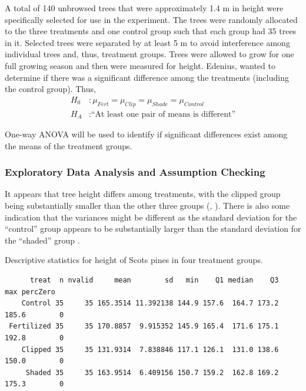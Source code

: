 \documentclass[10pt,openany]{book}\usepackage[]{graphicx}\usepackage[]{color}
\makeatletter
\newenvironment{kframe}{%
 \def\at@end@of@kframe{}%
 \ifinner\ifhmode%
  \def\at@end@of@kframe{\end{minipage}}%
  \begin{minipage}{\columnwidth}%
 \fi\fi%
 \def\FrameCommand##1{\hskip\@totalleftmargin \hskip-\fboxsep
 \colorbox{shadecolor}{##1}\hskip-\fboxsep
     \hskip-\linewidth \hskip-\@totalleftmargin \hskip\columnwidth}%
 \MakeFramed {\advance\hsize-\width
   \@totalleftmargin\z@ \linewidth\hsize
   \@setminipage}}%
 {\par\unskip\endMakeFramed%
 \at@end@of@kframe}
\newenvironment{knitrout}{}{} %
\makeatother
\begin{document}
A total of 140 unbrowsed trees that were approximately 1.4 m in height were specifically selected for use in the experiment.  The trees were randomly allocated to the three treatments and one control group such that each group had 35 trees in it.  Selected trees were separated by at least 5 m to avoid interference among individual trees and, thus, treatment groups.  Trees were allowed to grow for one full growing season and then were measured for height.  Edenius, wanted to determine if there was a significant difference among the treatments (including the control group).  Thus,
\[ \begin{split}
   H_{0}&: \mu_{Fert} = \mu_{Clip} = \mu_{Shade} = \mu_{Control} \\
   H_{A}&:\text{``At least one pair of means is different''}
\end{split} \]

One-way ANOVA will be used to identify if significant differences exist among the means of the treatment groups.

\subsubsection*{Exploratory Data Analysis and Assumption Checking}
It appears that tree height differs among treatments, with the clipped group being substantially smaller than the other three groups (, ).  There is also some indication that the variances might be different as the standard deviation for the ``control'' group appears to be substantially larger than the standard deviation for the ``shaded'' group .

\begin{table}
  \centering
  \caption{Descriptive statistics for height of Scots pines in four treatment groups.}\label{tab:OWAEx2DescStat}
\begin{knitrout}
\color{fgcolor}\begin{kframe}
\begin{verbatim}
      treat  n nvalid     mean        sd   min    Q1 median    Q3   max percZero
    Control 35     35 165.3514 11.392138 144.9 157.6  164.7 173.2 185.6        0
 Fertilized 35     35 170.8857  9.915352 145.9 165.4  171.6 175.1 192.8        0
    Clipped 35     35 131.9314  7.838846 117.1 126.1  131.0 138.6 150.0        0
     Shaded 35     35 163.9514  6.409156 150.7 159.2  162.8 169.2 175.3        0
\end{verbatim}
\end{kframe}
\end{knitrout}
\end{table}
\end{document}
